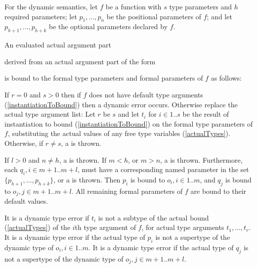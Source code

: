 \documentclass[makeidx]{article}
\begin{document}
{\LMHash{}%
For the dynamic semantics,
let $f$ be a function with $s$ type parameters and $h$ required parameters;
let $p_1, \ldots, p_n$ be the positional parameters of $f$;
and let $p_{h+1}, \ldots, p_{h+k}$ be the optional parameters declared by $f$.

\LMHash{}%
An evaluated actual argument part

\noindent
{}

\noindent
derived from an actual argument part of the form

\noindent
{}

\noindent
is bound to the formal type parameters and formal parameters of $f$ as follows:

\LMHash{}%
If $r = 0$ and $s > 0$ then
if $f$ does not have default type arguments
(\ref{instantiationToBound})
then a dynamic error occurs.
Otherwise replace the actual type argument list:
Let $r$ be $s$ and let $t_i$ for $i \in 1 .. s$ be the result of
instantiation to bound
(\ref{instantiationToBound})
on the formal type parameters of $f$,
substituting the actual values of any free type variables
(\ref{actualTypes}).
Otherwise, if $r \not= s$, a  is thrown.

\LMHash{}%
If $l > 0$ and $n \not= h$, a  is thrown.
If $m < h$, or $m > n$, a  is thrown.
Furthermore, each
$q_i, i \in m + 1 .. m + l$,
must have a corresponding named parameter in the set
$\{p_{h+1}, \ldots, p_{h+k}\}$,
or a  is thrown.
Then $p_i$ is bound to
$o_i, i \in 1 .. m$,
and $q_j$ is bound to $o_j, j \in m + 1 .. m + l$.
All remaining formal parameters of $f$ are bound to their default values.


\LMHash{}%
It is a dynamic type error if $t_i$ is not a subtype of the actual bound
(\ref{actualTypes})
of the $i$th type argument of $f$, for actual type arguments $t_1, \ldots, t_r$.
It is a dynamic type error if the actual type of $p_i$ is not
a supertype of the dynamic type of $o_i, i \in 1 .. m$.
It is a dynamic type error if the actual type of $q_j$ is not
a supertype of the dynamic type of $o_j, j \in m + 1 .. m + l$.


}
\end{document}
